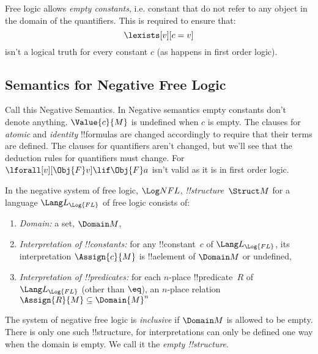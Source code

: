 \documentclass[../../../../include/open-logic-section]{subfiles}
\begin{document}


Free logic allows \emph{empty constants}, i.e. constant that do not refer to 
any object in the domain of the quantifiers. This is required 
to ensure that:
$$\lexists[v][c=v]$$ isn't a logical truth for every constant $c$ (as
happens in first order logic).

\subsection{Semantics for Negative Free Logic}

Call this Negative Semantics. In Negative semantics empty constants
don't denote anything. $\Value{c}{M}$ is undefined when $c$ is empty.
The clauses for \emph{atomic} and \emph{identity} !!{formula}s are
changed accordingly to require that their terms are defined. The
clauses for quantifiers aren't changed, but we'll see that the
deduction rules for quantifiers must change. For
$\lforall[v][\Obj{F}v]\lif \Obj{F}a$ isn't valid as it is in first
order logic. 


\begin{defn}[!!^{structure}s]
    In the negative system of free logic, $\Log NFL$,
     \emph{!!{structure}}~$\Struct M$ for a language
    $\Lang L_{\Log{FL}}$ of free logic consists of:
    \begin{enumerate}
    \item \emph{Domain:} a set, $\Domain M$,
    \item \emph{Interpretation of !!{constant}s:} for any !!{constant}~$c$ of
      $\Lang L_{\Log{FL}}$, its interpretation $\Assign{c}{M}$ is !!a{element} of 
      $\Domain M$ or undefined,
    \item \emph{Interpretation of !!{predicate}s:} for each $n$-place
      !!{predicate}~$R$ of $\Lang L_{\Log{FL}}$ (other than $\eq$), an $n$-place
      relation $\Assign{R}{M} \subseteq \Domain{M}^n$
    \end{enumerate}
    The system of negative free logic is \emph{inclusive} if $\Domain M$ is
    allowed to be empty. There is only one such !!{structure}, for interpretations
    can only be defined one way when the domain is empty. We call it the 
    \emph{empty !!{structure}}.
\end{defn}
\end{document}
